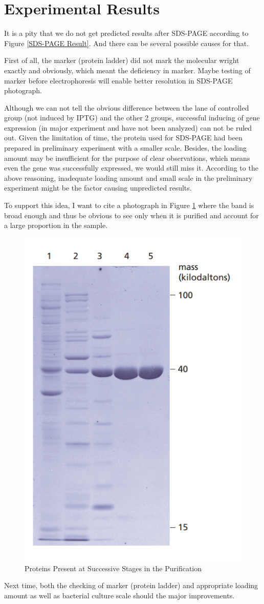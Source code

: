\documentclass{article}
\begin{document}
\section{Experimental Results}
It is a pity that we do not get predicted results after SDS-PAGE according to Figure \ref{SDS-PAGE Result}.
And there can be several possible causes for that.

First of all, the marker (protein ladder) did not mark the molecular wright exactly and obviously, which meant the deficiency in marker.
Maybe testing of marker before electrophoresis will enable better resolution in SDS-PAGE photograph.

Although we can not tell the obvious difference between the lane of controlled group (not induced by IPTG) and the other 2 groups, successful inducing of gene expression (in major experiment and have not been analyzed) can not be ruled out.
Given the limitation of time, the protein used for SDS-PAGE had been prepared in preliminary experiment with a smaller scale.
Besides, the loading amount may be insufficient for the purpose of clear observations, which means even the gene was successfully expressed, we would still miss it.
According to the above reasoning, inadequate loading amount and small scale in the preliminary experiment might be the factor causing unpredicted results.

To support this idea, I want to cite a photograph \cite{TheCell} in Figure \ref{Proteins Present at Successive Stages in the Purification} where the band is broad enough and thus be obvious to see only when it is purified and account for a large proportion in the sample.
\begin{figure}
    \centering
    \includegraphics[width=0.3\linewidth]{../Figures/SDS-PAGE from the cell.png}
    \caption{Proteins Present at Successive Stages in the Purification \cite{TheCell}}
    \label{Proteins Present at Successive Stages in the Purification}
\end{figure}

Next time, both the checking of marker (protein ladder) and appropriate loading amount as well as bacterial culture scale should the major improvements.





\end{document}
